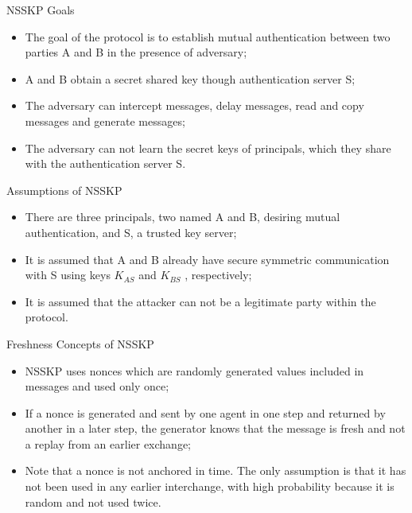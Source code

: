 \documentclass[12pt,table,xcolor={dvipsnames}]{beamer}
\begin{document}
\begin{frame}{NSSKP Goals}
\begin{itemize}
\item The goal of the protocol is to establish mutual authentication between two parties A and B in the presence of adversary;\pause
\item  A and B obtain a secret shared key though authentication server S;\pause
\item The adversary can intercept messages, delay messages, read and copy messages and generate messages;\pause
\item The adversary can not learn the secret keys of principals, which they share with the authentication server S.
\end{itemize}
\end{frame}

\begin{frame}{Assumptions of NSSKP}
\begin{itemize}
\item There are three principals, two named A and B, desiring mutual authentication, and
S, a trusted key server;\pause
\item It is assumed that A and B already have secure symmetric communication with
S using keys $K_{AS}$ and $K_{BS}$ , respectively;\pause
\item It is assumed that the attacker can not be a legitimate party within the protocol.
\end{itemize}
\end{frame}

\begin{frame}{Freshness Concepts of NSSKP}
\begin{itemize}
\item NSSKP uses nonces which are randomly generated values included in messages and used only once;\pause
\item If a nonce is generated and sent by one agent in one step and returned by another in a later step, the generator knows that the message is fresh and not a replay from an earlier exchange;\pause
\item Note that a nonce is not anchored in time. The only assumption is that it has not been used in any earlier interchange, with high probability because it is random and not used twice.
\end{itemize}
\end{frame}
\end{document}
